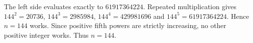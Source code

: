 The left side evaluates exactly to $61917364224$. Repeated multiplication gives $144^2=20736$, $144^3=2985984$, $144^4=429981696$ and $144^5=61917364224$. Hence $n=144$ works. Since positive fifth powers are strictly increasing, no other positive integer works. Thus $\boxed{n=144}$.
